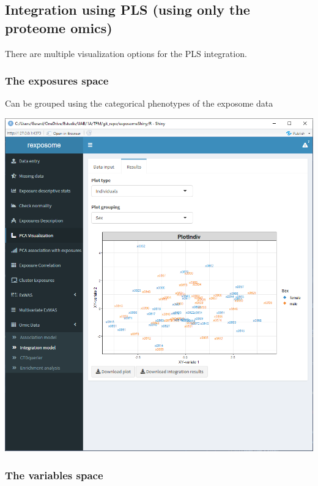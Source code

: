 \documentclass[
]{book}
\begin{document}
\hypertarget{integration-using-pls-using-only-the-proteome-omics}{%
\subsection{Integration using PLS (using only the proteome omics)}\label{integration-using-pls-using-only-the-proteome-omics}}

There are multiple visualization options for the PLS integration.

\hypertarget{the-exposures-space}{%
\subsubsection{The exposures space}\label{the-exposures-space}}

Can be grouped using the categorical phenotypes of the exposome data

\includegraphics{images/analysis12_5.png}

\hypertarget{the-variables-space}{%
\subsubsection{The variables space}\label{the-variables-space}}
\end{document}
